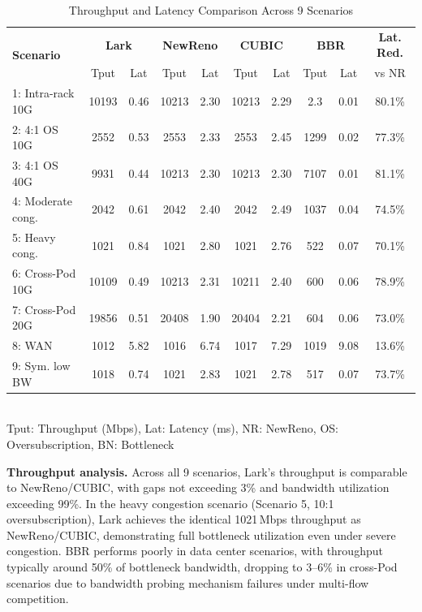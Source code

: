 \documentclass[10pt,twocolumn]{article}
\begin{document}
\begin{table}[htbp]
\centering
\caption{Throughput and Latency Comparison Across 9 Scenarios}
\label{tab:results}
\small
\begin{tabular}{l|cc|cc|cc|cc|c}
\toprule
\multirow{2}{*}{\textbf{Scenario}} & \multicolumn{2}{c|}{\textbf{Lark}} & \multicolumn{2}{c|}{\textbf{NewReno}} & \multicolumn{2}{c|}{\textbf{CUBIC}} & \multicolumn{2}{c|}{\textbf{BBR}} & \textbf{Lat. Red.} \\
 & Tput & Lat & Tput & Lat & Tput & Lat & Tput & Lat & vs NR \\
\midrule
1: Intra-rack 10G & 10193 & 0.46 & 10213 & 2.30 & 10213 & 2.29 & 2.3 & 0.01 & 80.1\% \\
2: 4:1 OS 10G & 2552 & 0.53 & 2553 & 2.33 & 2553 & 2.45 & 1299 & 0.02 & 77.3\% \\
3: 4:1 OS 40G & 9931 & 0.44 & 10213 & 2.30 & 10213 & 2.30 & 7107 & 0.01 & 81.1\% \\
4: Moderate cong. & 2042 & 0.61 & 2042 & 2.40 & 2042 & 2.49 & 1037 & 0.04 & 74.5\% \\
5: Heavy cong. & 1021 & 0.84 & 1021 & 2.80 & 1021 & 2.76 & 522 & 0.07 & 70.1\% \\
6: Cross-Pod 10G & 10109 & 0.49 & 10213 & 2.31 & 10211 & 2.40 & 600 & 0.06 & 78.9\% \\
7: Cross-Pod 20G & 19856 & 0.51 & 20408 & 1.90 & 20404 & 2.21 & 604 & 0.06 & 73.0\% \\
8: WAN & 1012 & 5.82 & 1016 & 6.74 & 1017 & 7.29 & 1019 & 9.08 & 13.6\% \\
9: Sym. low BW & 1018 & 0.74 & 1021 & 2.83 & 1021 & 2.78 & 517 & 0.07 & 73.7\% \\
\bottomrule
\end{tabular}
\\[2pt]
\footnotesize Tput: Throughput (Mbps), Lat: Latency (ms), NR: NewReno, OS: Oversubscription, BN: Bottleneck
\end{table}

\textbf{Throughput analysis.} Across all 9 scenarios, Lark's throughput is comparable to NewReno/CUBIC, with gaps not exceeding 3\% and bandwidth utilization exceeding 99\%. In the heavy congestion scenario (Scenario 5, 10:1 oversubscription), Lark achieves the identical 1021\,Mbps throughput as NewReno/CUBIC, demonstrating full bottleneck utilization even under severe congestion. BBR performs poorly in data center scenarios, with throughput typically around 50\% of bottleneck bandwidth, dropping to 3--6\% in cross-Pod scenarios due to bandwidth probing mechanism failures under multi-flow competition.
\end{document}
